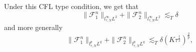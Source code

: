 \documentclass[10pt,a4paper]{article}
\begin{document}
  Under this CFL type condition, we get that 
  \begin{equation}\label{F1F2linftyL2}
      \|\mathcal F_1^n\|_{l^\infty_{\tau,N}L^2} + 
      \|\mathcal F_2^n\|_{l^\infty_{\tau,N}L^2} \lesssim_T \delta
  \end{equation}
  and more generally 
  \begin{equation}\label{F1F2lpLq}
      \|\mathcal F_1^n\|_{l^p_{\tau,N}L^q} + 
      \|\mathcal F_2^n\|_{l^p_{\tau,N}L^q} \lesssim_T \delta
      (K\tau^\frac12)^\frac2p,
  \end{equation}
\end{document}
